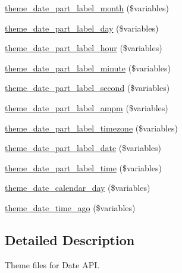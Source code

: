 \begin{DoxyCompactItemize}
\hyperlink{profiles_2dosomething_2modules_2contrib_2date_2date__api_2theme_2theme_8inc_a0020a59eb3f057fbe646ad3d5837082c}{theme\_\-date\_\-part\_\-label\_\-month} (\$variables)
\item 
\hyperlink{profiles_2dosomething_2modules_2contrib_2date_2date__api_2theme_2theme_8inc_a1afea8735a9cfc382697de7ce6b09fa0}{theme\_\-date\_\-part\_\-label\_\-day} (\$variables)
\item 
\hyperlink{profiles_2dosomething_2modules_2contrib_2date_2date__api_2theme_2theme_8inc_adf3fced76d9b9b01ae0efe4b83b488b9}{theme\_\-date\_\-part\_\-label\_\-hour} (\$variables)
\item 
\hyperlink{profiles_2dosomething_2modules_2contrib_2date_2date__api_2theme_2theme_8inc_a20f7b09ea3d8c2ccba5a049d805a9aaf}{theme\_\-date\_\-part\_\-label\_\-minute} (\$variables)
\item 
\hyperlink{profiles_2dosomething_2modules_2contrib_2date_2date__api_2theme_2theme_8inc_a7419226ba21ee61300adf34a8643fdcf}{theme\_\-date\_\-part\_\-label\_\-second} (\$variables)
\item 
\hyperlink{profiles_2dosomething_2modules_2contrib_2date_2date__api_2theme_2theme_8inc_aaba84c834dc97a4061f1c671292c667a}{theme\_\-date\_\-part\_\-label\_\-ampm} (\$variables)
\item 
\hyperlink{profiles_2dosomething_2modules_2contrib_2date_2date__api_2theme_2theme_8inc_aabc76a71b185dd83c1ce683cfcc9494a}{theme\_\-date\_\-part\_\-label\_\-timezone} (\$variables)
\item 
\hyperlink{profiles_2dosomething_2modules_2contrib_2date_2date__api_2theme_2theme_8inc_a23db2f104fb903403c3a5798c1575a4f}{theme\_\-date\_\-part\_\-label\_\-date} (\$variables)
\item 
\hyperlink{profiles_2dosomething_2modules_2contrib_2date_2date__api_2theme_2theme_8inc_a500670b612ff5002ad37b42922cd847f}{theme\_\-date\_\-part\_\-label\_\-time} (\$variables)
\item 
\hyperlink{profiles_2dosomething_2modules_2contrib_2date_2date__api_2theme_2theme_8inc_a804f07fe10bc29a9d8c99312d5535e13}{theme\_\-date\_\-calendar\_\-day} (\$variables)
\item 
\hyperlink{profiles_2dosomething_2modules_2contrib_2date_2date__api_2theme_2theme_8inc_ab45fb9ecb0188793b4c4318f449294a0}{theme\_\-date\_\-time\_\-ago} (\$variables)
\end{DoxyCompactItemize}


\subsection{Detailed Description}
Theme files for Date API. 

